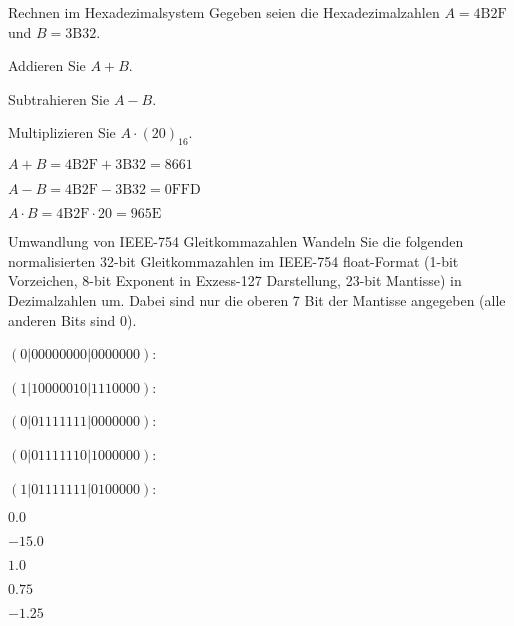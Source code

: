 \documentclass{exercisesheet}
\begin{document}
\begin{eexercises}{Rechnen im Hexadezimalsystem}
  {Gegeben seien die Hexadezimalzahlen $A = \mathrm{4B2F}$ und $B = \mathrm{3B32}$.}
  \item Addieren Sie $A+B$.
  \item Subtrahieren Sie $A-B$.
  \item Multiplizieren Sie $A\cdot (20)_{16}$.
\end{eexercises}

\begin{solutions}
  \item $A + B = \mathrm{4B2F} + \mathrm{3B32} = \mathrm{8661}$
  \item $A - B = \mathrm{4B2F} - \mathrm{3B32} = \mathrm{0FFD}$
  \item $A \cdot B = \mathrm{4B2F} \cdot 20 = \mathrm{965E}$
\end{solutions}

\begin{eexercises}{Umwandlung von IEEE-754 Gleitkommazahlen}{
    Wandeln Sie die folgenden normalisierten 32-bit Gleitkommazahlen im IEEE-754 float-Format (1-bit Vorzeichen, 8-bit Exponent in Exzess-127 Darstellung, 23-bit Mantisse) in Dezimalzahlen um. Dabei sind nur die oberen 7 Bit der Mantisse angegeben (alle anderen Bits sind 0).
  }
  \item $(0|0000 0000|0000 000)$:
  \item $(1|1000 0010|1110 000)$:
  \item $(0|0111 1111|0000 000)$:
  \item $(0|0111 1110|1000 000)$:
  \item $(1|0111 1111|0100 000)$:
\end{eexercises}

\begin{solutions}
  \item $0.0$
  \item $-15.0$
  \item $1.0$
  \item $0.75$
  \item $-1.25$
\end{solutions}
\end{document}
